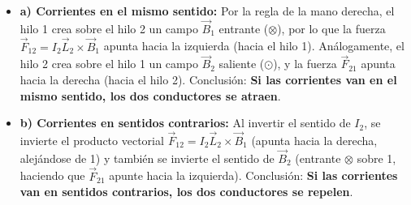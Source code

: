 \begin{ejercicio}
\begin{itemize}[leftmargin=*]
    \item \textbf{a) Corrientes en el mismo sentido:} Por la regla de la mano derecha, el hilo 1 crea sobre el hilo 2 un campo $\vec{B}_1$ entrante ($\otimes$), por lo que la fuerza $\vec{F}_{12} = I_2 \vec{L}_2 \times \vec{B}_1$ apunta hacia la izquierda (hacia el hilo 1). Análogamente, el hilo 2 crea sobre el hilo 1 un campo $\vec{B}_2$ saliente ($\odot$), y la fuerza $\vec{F}_{21}$ apunta hacia la derecha (hacia el hilo 2). Conclusión: \textbf{Si las corrientes van en el mismo sentido, los dos conductores se atraen}.
    \item \textbf{b) Corrientes en sentidos contrarios:} Al invertir el sentido de $I_2$, se invierte el producto vectorial $\vec{F}_{12} = I_2 \vec{L}_2 \times \vec{B}_1$ (apunta hacia la derecha, alejándose de 1) y también se invierte el sentido de $\vec{B}_2$ (entrante $\otimes$ sobre 1, haciendo que $\vec{F}_{21}$ apunte hacia la izquierda). Conclusión: \textbf{Si las corrientes van en sentidos contrarios, los dos conductores se repelen}.
\end{itemize}
\end{ejercicio}

